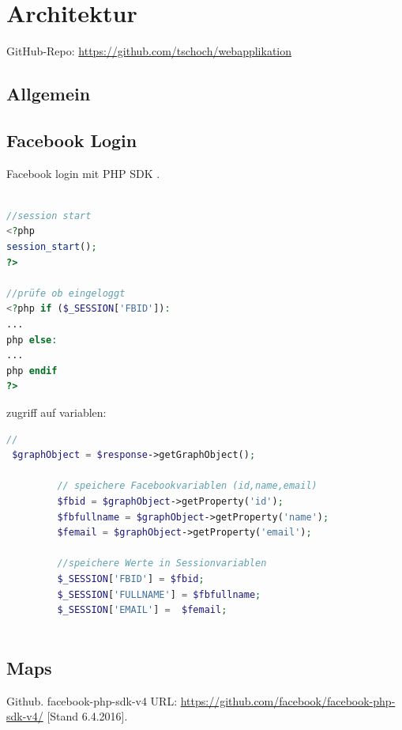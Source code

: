 \documentclass[11pt,a4paper]{scrreprt}
\begin{document}
\newpage
 


 
 

\chapter{Architektur}
GitHub-Repo: \url{https://github.com/tschoch/webapplikation}
\section{Allgemein}


\section{Facebook Login}
Facebook login mit PHP SDK \cite{phpsdk}.

\begin{lstlisting}[language=PHP, frame=single, captionpos=b,caption= search\_list.php]

//session start
<?php
session_start(); 
?>

//prüfe ob eingeloggt
<?php if ($_SESSION['FBID']):
...
php else: 
...
php endif 
?> 
\end{lstlisting}

\noindent
zugriff auf variablen:
\begin{lstlisting}[language=PHP, frame=single, captionpos=b,caption= fbconfig.php]
 // 
 $graphObject = $response->getGraphObject();
  
         // speichere Facebookvariablen (id,name,email)
         $fbid = $graphObject->getProperty('id');
         $fbfullname = $graphObject->getProperty('name');
         $femail = $graphObject->getProperty('email');
         
         //speichere Werte in Sessionvariablen
         $_SESSION['FBID'] = $fbid;
         $_SESSION['FULLNAME'] = $fbfullname;
         $_SESSION['EMAIL'] =  $femail;
 	    
\end{lstlisting}

\newpage
\section{Maps}

\newpage
\begin{thebibliography}{999}

  Github. facebook-php-sdk-v4
 URL: \url{https://github.com/facebook/facebook-php-sdk-v4/} [Stand 6.4.2016].
\end{thebibliography}
\end{document}
